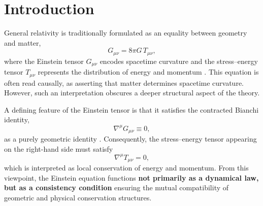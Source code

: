 \documentclass[%
 reprint,
 amsmath,amssymb,
 aps,
 prb,
]{revtex4-2}
\numberwithin{equation}{section}
\begin{document}

\maketitle


\section{Introduction}
\label{sec:introduction}

General relativity is traditionally formulated as an equality between geometry and matter,
\begin{equation}
G_{\mu\nu} = 8\pi G\, T_{\mu\nu},
\end{equation}
where the Einstein tensor $G_{\mu\nu}$ encodes spacetime curvature and the stress--energy tensor $T_{\mu\nu}$ represents the distribution of energy and momentum \cite{Einstein1915,MTW,Wald}. This equation is often read causally, as asserting that matter determines spacetime curvature. However, such an interpretation obscures a deeper structural aspect of the theory.

A defining feature of the Einstein tensor is that it satisfies the contracted Bianchi identity,
\begin{equation}
\nabla^\mu G_{\mu\nu} \equiv 0,
\end{equation}
as a purely geometric identity \cite{Wald}. Consequently, the stress--energy tensor appearing on the right-hand side must satisfy
\begin{equation}
\nabla^\mu T_{\mu\nu} = 0,
\end{equation}
which is interpreted as local conservation of energy and momentum. From this viewpoint, the Einstein equation functions  \textbf{not primarily as a dynamical law, but as a consistency condition} ensuring the mutual compatibility of geometric and physical conservation structures.
\end{document}
